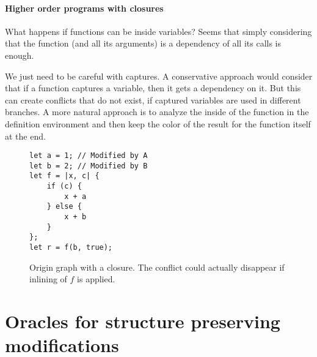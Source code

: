 \documentclass[a4paper,10pt]{article}
\begin{document}
\paragraph{Higher order programs with closures} What happens if functions can be inside variables? Seems that simply considering that the function (and all its arguments) is a dependency of all its calls is enough.

We just need to be careful with captures. A conservative approach would consider that if a function captures a variable, then it gets a dependency on it. But this can create conflicts that do not exist, if captured variables are used in different branches. A more natural approach is to analyze the inside of the function in the definition environment and then keep the color of the result for the function itself at the end.

\begin{figure}[!ht]
\begin{minipage}{.5\textwidth}
\begin{lstlisting}
let a = 1; // Modified by A
let b = 2; // Modified by B
let f = |x, c| {
    if (c) {
        x + a
    } else {
        x + b
    }
};
let r = f(b, true);
\end{lstlisting}
\end{minipage}\hfill
\begin{minipage}{.45\textwidth}
\centering{}
\end{minipage}
\caption{Origin graph with a closure. The conflict could actually disappear if inlining of $f$ is applied.}
\label{fig:closure}
\end{figure}

\section{Oracles for structure preserving modifications}
\end{document}
